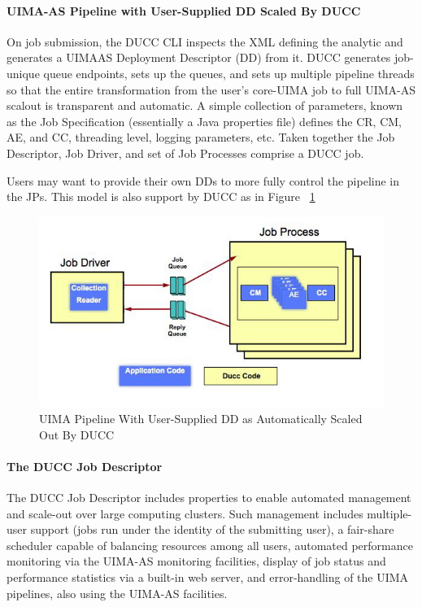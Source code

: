     \paragraph{UIMA-AS Pipeline with User-Supplied DD Scaled By DUCC}
    On job submission, the DUCC CLI inspects the XML defining the analytic and generates a UIMAAS
    Deployment Descriptor (DD) from it. DUCC generates job-unique queue endpoints, sets up the
    queues, and sets up multiple pipeline threads so that the entire transformation from the user's
    core-UIMA job to full UIMA-AS scalout is transparent and automatic.  A simple collection of
    parameters, known as the Job Specification (essentially a Java properties file) defines the CR,
    CM, AE, and CC, threading level, logging parameters, etc. Taken together the Job Descriptor, Job
    Driver, and set of Job Processes comprise a DUCC job.

    Users may want to provide their own DDs to more fully control the pipeline in the JPs. This
    model is also support by DUCC as in Figure ~\ref{UIMA-AS-pipeline-DUCC-DD}


    \begin{figure}[H]
      \centering
      \includegraphics[bb=0 0 571 316,width=5.5in]{images/ducc-parallel.jpg}
      \caption{UIMA Pipeline With User-Supplied DD as Automatically Scaled Out By DUCC}
      \label{UIMA-AS-pipeline-DUCC-DD}
    \end{figure}


    \paragraph{The DUCC Job Descriptor}
    The DUCC Job Descriptor includes properties to enable automated management and scale-out 
    over large computing clusters. Such management includes multiple-user support (jobs run under 
    the identity of the submitting user), a fair-share scheduler capable of balancing resources among 
    all users, automated performance monitoring via the UIMA-AS monitoring facilities, display of 
    job status and performance statistics via a built-in web server, and error-handling of the UIMA 
    pipelines, also using the UIMA-AS facilities. 

